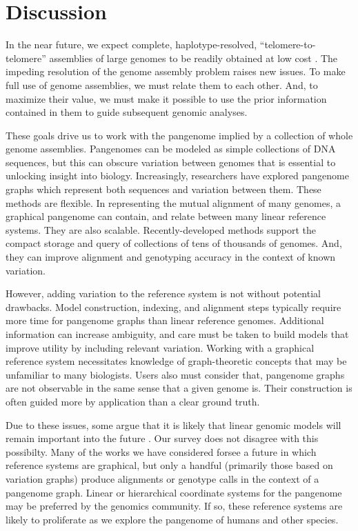 \section{Discussion}
\label{sec:discussion}

In the near future, we expect complete, haplotype-resolved, ``telomere-to-telomere'' assemblies of large genomes to be readily obtained at low cost \cite{miga2019telomere}.
The impeding resolution of the genome assembly problem raises new issues.
To make full use of genome assemblies, we must relate them to each other.
And, to maximize their value, we must make it possible to use the prior information contained in them to guide subsequent genomic analyses.

These goals drive us to work with the pangenome implied by a collection of whole genome assemblies.
Pangenomes can be modeled as simple collections of DNA sequences, but this can obscure variation between genomes that is essential to unlocking insight into biology.
Increasingly, researchers have explored pangenome graphs which represent both sequences and variation between them.
These methods are flexible.
In representing the mutual alignment of many genomes, a graphical pangenome can contain, and relate between many linear reference systems.
They are also scalable.
Recently-developed methods support the compact storage and query of collections of tens of thousands of genomes.
And, they can improve alignment and genotyping accuracy in the context of known variation.

However, adding variation to the reference system is not without potential drawbacks.
Model construction, indexing, and alignment steps typically require more time for pangenome graphs than linear reference genomes.
Additional information can increase ambiguity, and care must be taken to build models that improve utility by including relevant variation.
Working with a graphical reference system necessitates knowledge of graph-theoretic concepts that may be unfamiliar to many biologists.
Users also must consider that, pangenome graphs are not observable in the same sense that a given genome is.
Their construction is often guided more by application than a clear ground truth.

Due to these issues, some argue that it is likely that linear genomic models will remain important into the future \cite{Sherman_2020}.
Our survey does not disagree with this possibilty.
Many of the works we have considered forsee a future in which reference systems are graphical, but only a handful (primarily those based on variation graphs) produce alignments or genotype calls in the context of a pangenome graph.
Linear or hierarchical coordinate systems for the pangenome may be preferred by the genomics community.
If so, these reference systems are likely to proliferate as we explore the pangenome of humans and other species.

